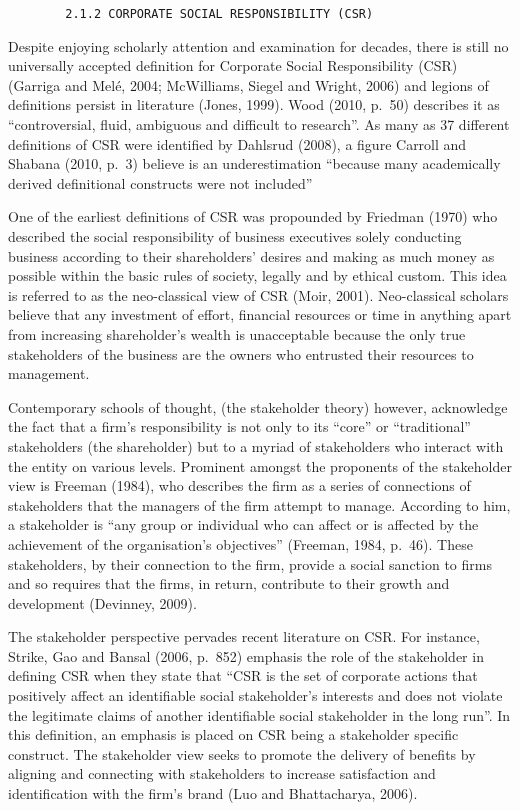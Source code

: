 \documentclass[
]{mitthesis}
\begin{document}
\begin{verbatim}
        2.1.2 CORPORATE SOCIAL RESPONSIBILITY (CSR)
\end{verbatim}

Despite enjoying scholarly attention and examination for decades, there is still no universally accepted definition for Corporate Social Responsibility (CSR) (Garriga and Melé, 2004; McWilliams, Siegel and Wright, 2006) and legions of definitions persist in literature (Jones, 1999). Wood (2010, p.~50) describes it as ``controversial, fluid, ambiguous and difficult to research''. As many as 37 different definitions of CSR were identified by Dahlsrud (2008), a figure Carroll and Shabana (2010, p.~3) believe is an underestimation ``because many academically derived definitional constructs were not included''

One of the earliest definitions of CSR was propounded by Friedman (1970) who described the social responsibility of business executives solely conducting business according to their shareholders' desires and making as much money as possible within the basic rules of society, legally and by ethical custom. This idea is referred to as the neo-classical view of CSR (Moir, 2001). Neo-classical scholars believe that any investment of effort, financial resources or time in anything apart from increasing shareholder's wealth is unacceptable because the only true stakeholders of the business are the owners who entrusted their resources to management.

Contemporary schools of thought, (the stakeholder theory) however, acknowledge the fact that a firm's responsibility is not only to its ``core'' or ``traditional'' stakeholders (the shareholder) but to a myriad of stakeholders who interact with the entity on various levels. Prominent amongst the proponents of the stakeholder view is Freeman (1984), who describes the firm as a series of connections of stakeholders that the managers of the firm attempt to manage. According to him, a stakeholder is ``any group or individual who can affect or is affected by the achievement of the organisation's objectives'' (Freeman, 1984, p.~46). These stakeholders, by their connection to the firm, provide a social sanction to firms and so requires that the firms, in return, contribute to their growth and development (Devinney, 2009).

The stakeholder perspective pervades recent literature on CSR. For instance, Strike, Gao and Bansal (2006, p.~852) emphasis the role of the stakeholder in defining CSR when they state that ``CSR is the set of corporate actions that positively affect an identifiable social stakeholder's interests and does not violate the legitimate claims of another identifiable social stakeholder in the long run''. In this definition, an emphasis is placed on CSR being a stakeholder specific construct. The stakeholder view seeks to promote the delivery of benefits by aligning and connecting with stakeholders to increase satisfaction and identification with the firm's brand (Luo and Bhattacharya, 2006).
\end{document}
